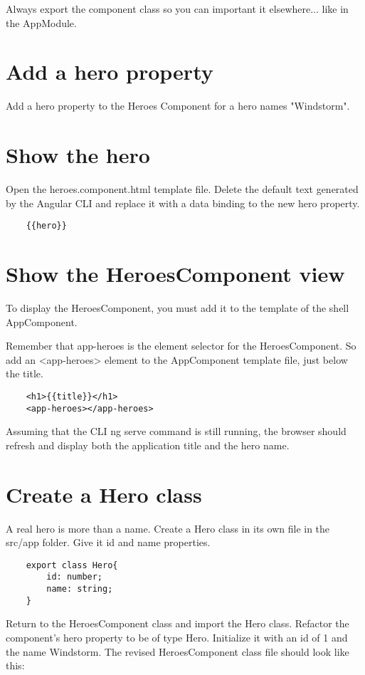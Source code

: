 Always export the component class so you can important it elsewhere... like in the AppModule.

\section{Add a hero property}
Add a hero property to the Heroes Component for a hero names "Windstorm".

\section{Show the hero}
Open the heroes.component.html template file. Delete the default text generated by the Angular CLI and replace it with a data binding to the new hero property.

\begin{lstlisting}
    {{hero}}
\end{lstlisting}

\section{Show the HeroesComponent view}
To display the HeroesComponent, you must add it to the template of the shell AppComponent.

Remember that app-heroes is the element selector for the HeroesComponent. So add an <app-heroes> element to the AppComponent template file, just below the title.

\begin{lstlisting}
    <h1>{{title}}</h1>
    <app-heroes></app-heroes>
\end{lstlisting}

Assuming that the CLI ng serve command is still running, the browser should refresh and display both the application title and the hero name.

\section{Create a Hero class}
A real hero is more than a name. Create a Hero class in its own file in the src/app folder. Give it id and name properties.

\begin{lstlisting}
    export class Hero{
        id: number;
        name: string;
    }
\end{lstlisting}

Return to the HeroesComponent class and import the Hero class.
Refactor the component's hero property to be of type Hero. Initialize it with an id of 1 and the name Windstorm.
The revised HeroesComponent class file should look like this:

